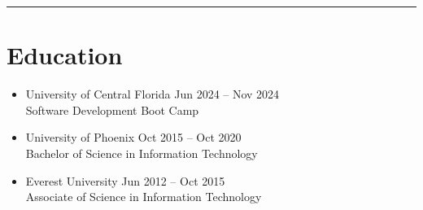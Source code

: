\documentclass[letterpaper,10pt]{article}
\newcommand{\separator}{\vspace{4pt}\hrule\vspace{4pt}}
\newcommand{\place}[2]{#1 \hfill #2}
\begin{document}
\separator
\section*{Education}
\begin{itemize}
    \item{
        \place{University of Central Florida}{Jun 2024 – Nov 2024} \\
        Software Development Boot Camp \\
    }
    \item{
        \place{University of Phoenix}{Oct 2015 – Oct 2020} \\
        Bachelor of Science in Information Technology \\
    }
    \item{
        \place{Everest University}{Jun 2012 – Oct 2015} \\
        Associate of Science in Information Technology
    }    
\end{itemize}



\newpage
\end{document}
